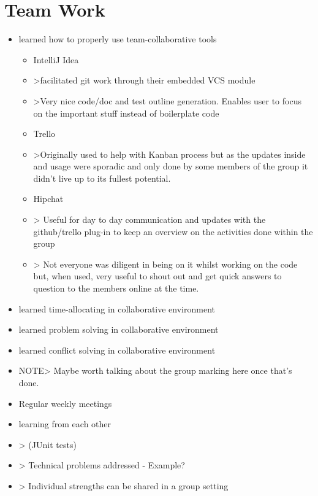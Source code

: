 \section{Team Work}
    \begin{itemize}
        \item learned how to properly use team-collaborative tools
		\begin{itemize}
                \item IntelliJ Idea
                \item >facilitated git work through their embedded VCS module
                \item >Very nice code/doc and test outline generation. Enables user to focus on the important stuff instead of boilerplate code
                \item Trello
                \item >Originally used to help with Kanban process but as the updates inside and usage were sporadic and only done by some members of the group it didn't live up to its fullest potential.
                \item Hipchat
                \item > Useful for day to day communication and updates with the github/trello plug-in to keep an overview on the activities done within the group
                \item > Not everyone was diligent in being on it whilst working on the code but, when used, very useful to shout out and get quick answers to question to the members online at the time.
         \end{itemize}
         
        \item learned time-allocating in collaborative environment
        \item learned  problem solving in collaborative environment
        \item learned  conflict solving in collaborative environment
        \item NOTE> Maybe worth talking about the group marking here once that's done.
        \item Regular weekly meetings
        \item learning from each other
        \item > (JUnit tests)
        \item > Technical problems addressed - Example?
        \item > Individual strengths can be shared in a group setting
    \end {itemize}
    
